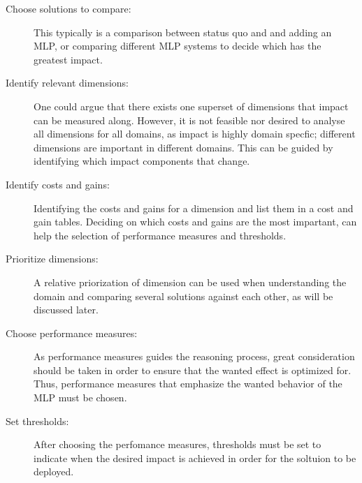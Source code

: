 \documentclass{article}
\theoremstyle{theorem}
\theoremstyle{definition}
\begin{document}
\begin{description}
\item [Choose solutions to compare:]
This typically is a comparison between status quo and and adding an MLP, or comparing different MLP systems to decide which has the greatest impact. 

\item [Identify relevant dimensions:] 
One could argue that there exists one superset of dimensions that impact can be measured along.
However, it is not feasible nor desired to analyse all dimensions for all domains, as impact is highly domain specfic; different dimensions are important in different domains.
This can be guided by identifying which impact components that change.

\item[Identify costs and gains:] 
Identifying the costs and gains for a dimension and list them in a cost and gain tables.
Deciding on which costs and gains are the most impartant, can help the selection of performance measures and thresholds.


\item[Prioritize dimensions:]
A relative priorization of dimension can be used when understanding the domain and comparing several solutions against each other, as will be discussed later.

\item[Choose performance measures:]
As performance measures guides the reasoning process, great consideration should be taken in order to ensure that the wanted effect is optimized for.
Thus, performance measures that emphasize the wanted behavior of the MLP must be chosen.

\item[Set thresholds:]
After choosing the perfomance measures, thresholds must be set to indicate when the desired impact is achieved in order for the soltuion to be deployed. 
\end{description}
\end{document}
